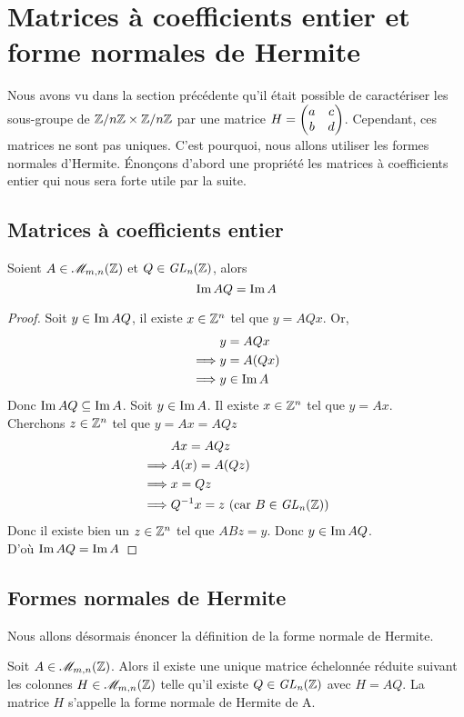 \documentclass[11pt]{article}
\begin{document}
\section{Matrices à coefficients entier et forme normales de Hermite}
Nous avons vu dans la section précédente qu'il était possible de caractériser les sous-groupe de
$\mathbb Z/n\mathbb Z \times \mathbb Z/n\mathbb Z$ par une matrice $H = \begin{pmatrix} a & c\\ b & d \end{pmatrix}$. Cependant, ces matrices ne sont pas uniques. C'est
pourquoi, nous allons utiliser les formes normales d'Hermite.
Énonçons d'abord une propriété les matrices à coefficients entier qui nous sera forte utile par la suite.
\subsection{Matrices à coefficients entier}
\begin{proposition}\label{ima_imaq}
	Soient $A \in \mathscr{M}_{m,n}(\mathbb Z)$ et $Q \in \it {GL}_n(\mathbb Z)$, alors
	$$\operatorname{Im} AQ = \operatorname{Im} A$$
\end{proposition}
\begin{proof}
	Soit $y \in \operatorname{Im} AQ$, il existe $x \in \mathbb Z^n$ tel que $y = AQx$. Or,
	\begin{align*}
		         & y = AQx     \\
		\implies & y = A(Qx)   \\
		\implies & y \in \operatorname{Im} A
	\end{align*}
	Donc $\operatorname{Im} AQ \subseteq \operatorname{Im} A$.
	\newpage
	Soit $y \in \operatorname{Im} A$. Il existe $x \in \mathbb Z^n$ tel que $y = Ax$.\\
	Cherchons $z \in \mathbb Z^n$ tel que $y = Ax = AQz$
	\begin{align*}
		         & Ax = AQz                                     \\
		\implies & A(x) = A(Qz)                                 \\
		\implies & x = Qz                                       \\
		\implies & Q^{-1} x = z \text{ (car $B \in \it {GL}_n(\mathbb Z)$)}
	\end{align*}
	Donc il existe bien un $z \in \mathbb Z^n$ tel que $ABz = y$. Donc $y \in \operatorname{Im} AQ$.\\
	D'où $\operatorname{Im} AQ = \operatorname{Im} A$

\end{proof}
\subsection{Formes normales de Hermite}
Nous allons désormais énoncer la définition de la forme normale de Hermite.
\begin{definition}
	Soit $A \in \mathscr{M}_{m,n}(\mathbb Z)$. Alors il existe une unique matrice échelonnée
	réduite suivant les colonnes $H \in \mathscr{M}_{m,n}(\mathbb Z)$ telle qu'il existe $Q \in \it {GL}_n(\mathbb Z)$
	avec $H = AQ$. La matrice $H$ s'appelle la forme normale de Hermite de A.
\end{definition}
\end{document}
